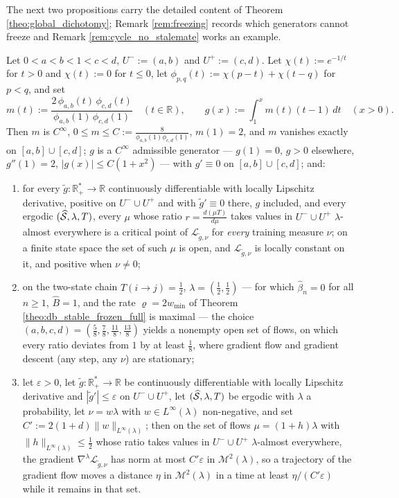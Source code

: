 The next two propositions carry the detailed content of Theorem \ref{theo:global_dichotomy}; Remark \ref{rem:freezing} records which generators cannot freeze and Remark \ref{rem:cycle_no_stalemate} works an example.

\begin{proposition}\label{prop:nonlinear_freezing}
Let $0<a<b<1<c<d$, $U^-:=(a,b)$ and $U^+:=(c,d)$. Let $\chi(t):=e^{-1/t}$ for $t>0$ and $\chi(t):=0$ for $t\leq0$, let $\phi_{p,q}(t):=\chi(p-t)+\chi(t-q)$ for $p<q$, and set
\begin{equation*}
    m(t):=\frac{2\,\phi_{a,b}(t)\,\phi_{c,d}(t)}{\phi_{a,b}(1)\,\phi_{c,d}(1)}\quad(t\in\mathbb R),\qquad g(x):=\int_1^x m(t)(t-1)\,dt\quad(x>0).
\end{equation*}
Then $m$ is $C^\infty$, $0\leq m\leq C:=\frac8{\phi_{a,b}(1)\phi_{c,d}(1)}$, $m(1)=2$, and $m$ vanishes exactly on $[a,b]\cup[c,d]$; $g$ is a $C^\infty$ admissible generator --- $g(1)=0$, $g>0$ elsewhere, $g''(1)=2$, $|g(x)|\leq C(1+x^2)$ --- with $g'\equiv0$ on $[a,b]\cup[c,d]$; and:
\begin{enumerate}
    \item for every $\tilde g:\mathbb R_+^*\rightarrow\mathbb R$ continuously differentiable with locally Lipschitz derivative, positive on $U^-\cup U^+$ and with $\tilde g'\equiv0$ there, $g$ included, and every ergodic $(\widehat{\mathcal S},\lambda,T)$, every $\mu$ whose ratio $r=\frac{d(\mu T)}{d\mu}$ takes values in $U^-\cup U^+$ $\lambda$-almost everywhere is a critical point of $\mathcal L_{\tilde g,\nu}$ for \emph{every} training measure $\nu$; on a finite state space the set of such $\mu$ is open, and $\mathcal L_{\tilde g,\nu}$ is locally constant on it, and positive when $\nu\neq0$;
    \item on the two-state chain $T(i\rightarrow j)=\frac12$, $\lambda=(\frac12,\frac12)$ --- for which $\widehat\beta_n=0$ for all $n\geq1$, $\widehat B=1$, and the rate $\varrho=2w_{\min}$ of Theorem \ref{theo:db_stable_frozen_full} is maximal --- the choice $(a,b,c,d)=(\frac58,\frac78,\frac{11}8,\frac{13}8)$ yields a nonempty open set of flows, on which every ratio deviates from $1$ by at least $\frac18$, where gradient flow and gradient descent (any step, any $\nu$) are stationary;
    \item let $\varepsilon>0$, let $\tilde g:\mathbb R_+^*\rightarrow\mathbb R$ be continuously differentiable with locally Lipschitz derivative and $|\tilde g'|\leq\varepsilon$ on $U^-\cup U^+$, let $(\widehat{\mathcal S},\lambda,T)$ be ergodic with $\lambda$ a probability, let $\nu=w\lambda$ with $w\in L^\infty(\lambda)$ non-negative, and set $C':=2(1+d)\|w\|_{L^\infty(\lambda)}$; then on the set of flows $\mu=(1+h)\lambda$ with $\|h\|_{L^\infty(\lambda)}\leq\frac12$ whose ratio takes values in $U^-\cup U^+$ $\lambda$-almost everywhere, the gradient $\nabla^\lambda\mathcal L_{\tilde g,\nu}$ has norm at most $C'\varepsilon$ in $\mathcal M^2(\lambda)$, so a trajectory of the gradient flow moves a distance $\eta$ in $\mathcal M^2(\lambda)$ in a time at least $\eta/(C'\varepsilon)$ while it remains in that set.

\end{enumerate}
\end{proposition}
